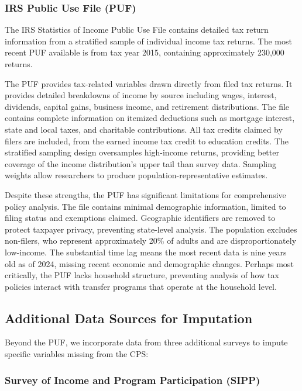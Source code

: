 \subsubsection{IRS Public Use File (PUF)}

The IRS Statistics of Income Public Use File contains detailed tax return information from a stratified sample of individual income tax returns. The most recent PUF available is from tax year 2015, containing approximately 230,000 returns.

The PUF provides tax-related variables drawn directly from filed tax returns. It provides detailed breakdowns of income by source including wages, interest, dividends, capital gains, business income, and retirement distributions. The file contains complete information on itemized deductions such as mortgage interest, state and local taxes, and charitable contributions. All tax credits claimed by filers are included, from the earned income tax credit to education credits. The stratified sampling design oversamples high-income returns, providing better coverage of the income distribution's upper tail than survey data. Sampling weights allow researchers to produce population-representative estimates.

Despite these strengths, the PUF has significant limitations for comprehensive policy analysis. The file contains minimal demographic information, limited to filing status and exemptions claimed. Geographic identifiers are removed to protect taxpayer privacy, preventing state-level analysis. The population excludes non-filers, who represent approximately 20\% of adults and are disproportionately low-income. The substantial time lag means the most recent data is nine years old as of 2024, missing recent economic and demographic changes. Perhaps most critically, the PUF lacks household structure, preventing analysis of how tax policies interact with transfer programs that operate at the household level.

\subsection{Additional Data Sources for Imputation}

Beyond the PUF, we incorporate data from three additional surveys to impute specific variables missing from the CPS:

\subsubsection{Survey of Income and Program Participation (SIPP)}


